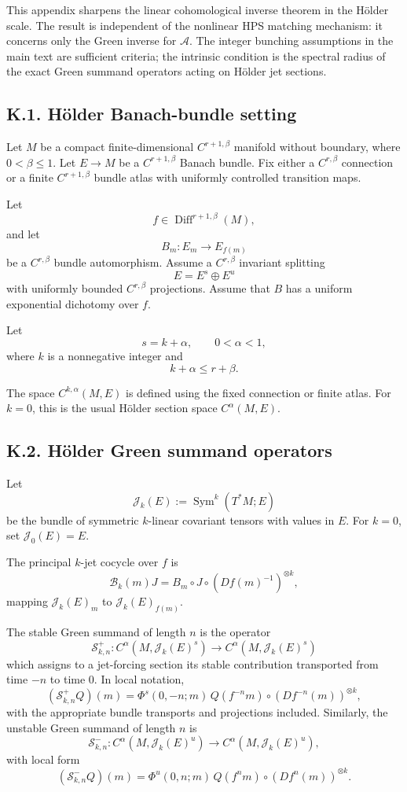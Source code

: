 \documentclass[12pt,a4paper]{article}
\theoremstyle{plain}
\numberwithin{equation}{section}
\numberwithin{theorem}{section}
\begin{document}
This appendix sharpens the linear cohomological inverse theorem in the H\"older scale. The result is independent of the nonlinear HPS matching mechanism: it concerns only the Green inverse for $\mathcal A$. The integer bunching assumptions in the main text are sufficient criteria; the intrinsic condition is the spectral radius of the exact Green summand operators acting on H\"older jet sections.

\subsection{K.1. H\"older Banach-bundle setting}

Let $M$ be a compact finite-dimensional $C^{r+1,\beta}$ manifold without boundary, where $0<\beta\le1$. Let $E\to M$ be a $C^{r+1,\beta}$ Banach bundle. Fix either a $C^{r,\beta}$ connection or a finite $C^{r+1,\beta}$ bundle atlas with uniformly controlled transition maps.

Let
\[
f\in\operatorname{Diff}^{r+1,\beta}(M),
\]
and let
\[
B_m:E_m\to E_{f(m)}
\]
be a $C^{r,\beta}$ bundle automorphism. Assume a $C^{r,\beta}$ invariant splitting
\[
E=E^s\oplus E^u
\]
with uniformly bounded $C^{r,\beta}$ projections. Assume that $B$ has a uniform exponential dichotomy over $f$.

Let
\[
s=k+\alpha,
\qquad
0<\alpha<1,
\]
where $k$ is a nonnegative integer and
\[
k+\alpha\le r+\beta.
\]

The space $C^{k,\alpha}(M,E)$ is defined using the fixed connection or finite atlas. For $k=0$, this is the usual H\"older section space $C^\alpha(M,E)$.

\subsection{K.2. H\"older Green summand operators}

Let
\[
\mathcal J_k(E):=
\operatorname{Sym}^k(T^*M;E)
\]
be the bundle of symmetric $k$-linear covariant tensors with values in $E$. For $k=0$, set $\mathcal J_0(E)=E$.

The principal $k$-jet cocycle over $f$ is
\[
\mathscr B_k(m)J
=
B_m\circ J\circ(Df(m)^{-1})^{\otimes k},
\]
mapping $\mathcal J_k(E)_m$ to $\mathcal J_k(E)_{f(m)}$.

The stable Green summand of length $n$ is the operator
\[
\mathcal S_{k,n}^+:
C^\alpha(M,
\mathcal J_k(E)^s)
\to
C^\alpha(M,
\mathcal J_k(E)^s)
\]
which assigns to a jet-forcing section its stable contribution transported from time $-n$ to time $0$. In local notation,
\[
(\mathcal S_{k,n}^+Q)(m)
=
\Phi^s(0,-n;m)
\,Q(f^{-n}m)
\circ
(Df^{-n}(m))^{\otimes k},
\]
with the appropriate bundle transports and projections included. Similarly, the unstable Green summand of length $n$ is
\[
\mathcal S_{k,n}^-:
C^\alpha(M,
\mathcal J_k(E)^u)
\to
C^\alpha(M,
\mathcal J_k(E)^u),
\]
with local form
\[
(\mathcal S_{k,n}^-Q)(m)
=
\Phi^u(0,n;m)
\,Q(f^n m)
\circ
(Df^{n}(m))^{\otimes k}.
\]
\end{document}
